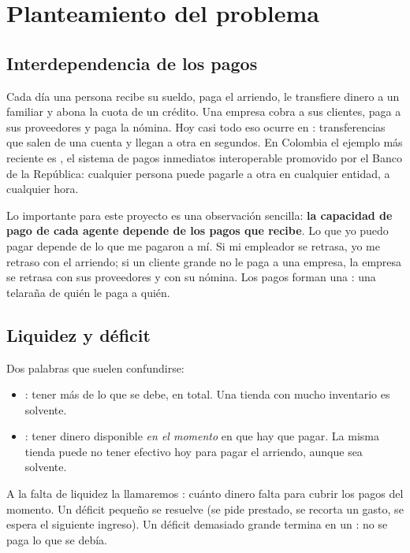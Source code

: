\chapter{Planteamiento del problema}

\section{Interdependencia de los pagos}
Cada día una persona recibe su sueldo, paga el arriendo, le transfiere dinero a un
familiar y abona la cuota de un crédito. Una empresa cobra a sus clientes, paga a sus
proveedores y paga la nómina. Hoy casi todo eso ocurre en : transferencias que salen de una cuenta y llegan a otra en segundos. En
Colombia el ejemplo más reciente es , el sistema de pagos inmediatos
interoperable promovido por el Banco de la República: cualquier persona puede pagarle
a otra en cualquier entidad, a cualquier hora.

Lo importante para este proyecto es una observación sencilla: \textbf{la capacidad de pago de cada agente depende de los pagos que recibe}.
Lo que yo puedo pagar depende de lo que me pagaron a mí. Si mi empleador se retrasa,
yo me retraso con el arriendo; si un cliente grande no le paga a una empresa, la
empresa se retrasa con sus proveedores y con su nómina. Los pagos forman una
: una telaraña de quién le paga a quién.

\section{Liquidez y déficit}
Dos palabras que suelen confundirse:
\begin{itemize}
\item {}: tener más de lo que se debe, en total. Una tienda con mucho
inventario es solvente.
\item {}: tener dinero disponible \emph{en el momento} en que hay que
pagar. La misma tienda puede no tener efectivo hoy para pagar el arriendo, aunque
sea solvente.
\end{itemize}
A la falta de liquidez la llamaremos : cuánto dinero falta para cubrir
los pagos del momento. Un déficit pequeño se resuelve (se pide prestado, se recorta un
gasto, se espera el siguiente ingreso). Un déficit demasiado grande termina en un
: no se paga lo que se debía.

